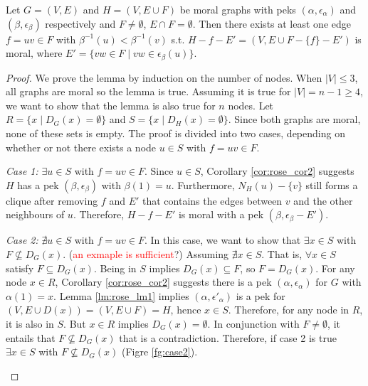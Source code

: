 \begin{lemma}
\label{lm:rose_lm2}
Let $G=(V,E)$ and $H=(V,E\cup F)$ be moral graphs with peks $(\alpha,\epsilon_{\alpha})$ and $(\beta,\epsilon_{\beta})$ respectively and $F\neq \emptyset$, $E \cap F=\emptyset$. Then there exists at least one edge $f=uv \in F$ with $\beta^{-1}(u) < \beta^{-1}(v)$ s.t. $H-f-E'=(V,E\cup F-\{f\}-E')$ is moral, where $E'=\{vw \in F \mid vw \in \epsilon_{\beta}(u)\}$.
\end{lemma}
\begin{proof}
We prove the lemma by induction on the number of nodes. When $|V| \le 3$, all graphs are moral so the lemma is true. Assuming it is true for $|V|=n-1 \ge 4$, we want to show that the lemma is also true for $n$ nodes. Let $R=\{x\mid D_G(x)=\emptyset\}$ and $S=\{x\mid D_{H}(x)=\emptyset\}$. Since both graphs are moral, none of these sets is empty. The proof is divided into two cases, depending on whether or not there exists a node $u \in S$ with $f=uv \in F$.

\textit{Case 1:} $\exists u \in S$ with  $f=uv\in F$. Since $u\in S$, Corollary \ref{cor:rose_cor2} suggests $H$ has a pek $(\beta,\epsilon_{\beta})$ with $\beta(1)=u$. Furthermore, $N_H(u)-\{v\}$ still forms a clique after removing $f$ and $E'$ that contains the edges between $v$ and the other neighbours of $u$. Therefore, $H-f-E'$ is moral with a pek $(\beta,\epsilon_{\beta}-E')$. 

\textit{Case 2:} $\nexists u \in S$ with  $f=uv\in F$. In this case, we want to show that $\exists x\in S$ with $F\nsubseteq D_G(x)$. (\textcolor{red}{an exmaple is sufficient}?) Assuming $\nexists x \in S$. That is, $\forall x\in S$ satisfy $F\subseteq D_G(x)$. Being in $S$ implies $D_G(x) \subseteq F$, so $F=D_G(x)$. For any node $x\in R$, Corollary \ref{cor:rose_cor2} suggests there is a pek $(\alpha, \epsilon_{\alpha})$ for $G$ with $\alpha(1)=x$. Lemma \ref{lm:rose_lm1} implies $(\alpha,\epsilon'_{\alpha})$ is a pek for $(V,E\cup D(x))=(V,E\cup F)=H$, hence $x\in S$. Therefore, for any node in $R$, it is also in $S$. But $x\in R$ implies $D_G(x)=\emptyset$. In conjunction with $F\neq \emptyset$, it entails that $F \nsubseteq D_G(x)$ that is a contradiction. Therefore, if case 2 is true $\exists x\in S$ with $F\nsubseteq D_G(x)$ (Figre \ref{fg:case2}). 
\begin{figure}[H]
\centering
{}
\end{figure}
\end{proof}
